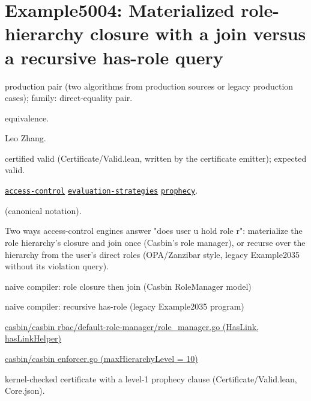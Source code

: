 \documentclass[10pt]{article}
\begin{document}
\Needspace{0.45\textheight}

\section{Example5004: Materialized role-hierarchy closure with a join versus a recursive has-role query}\label{case:Example5004}

\begin{description}[leftmargin=2.6cm,style=nextline,itemsep=1pt]

\item[Category] production pair (two algorithms from production sources or legacy production cases); family: direct-equality pair.

\item[Kind] equivalence.

\item[Contributors] Leo Zhang.

\item[Status] certified valid (Certificate/Valid.lean, written by the certificate emitter); expected valid.

\item[Tags] \hyperref[tag:access-control]{\texttt{access-control}} \hyperref[tag:evaluation-strategies]{\texttt{evaluation-strategies}} \hyperref[tag:prophecy]{\texttt{prophecy}}.

\item[Input]  (canonical notation).

\item[Summary] Two ways access-control engines answer "does user u hold role r": materialize the role hierarchy's closure and join once (Casbin's role manager), or recurse over the hierarchy from the user's direct roles (OPA/Zanzibar style, legacy Example2035 without its violation query).

\item[Sides] naive compiler: role closure then join (Casbin RoleManager model) \par naive compiler: recursive has-role (legacy Example2035 program)

\item[Sources] {\raggedright \href{https://github.com/casbin/casbin/blob/master/rbac/default-role-manager/role_manager.go}{casbin/casbin rbac/default-role-manager/role\_manager.go (HasLink, hasLinkHelper)} \par \href{https://github.com/casbin/casbin/blob/master/enforcer.go}{casbin/casbin enforcer.go (maxHierarchyLevel = 10)}\par}

\item[Prophecy] kernel-checked certificate with a level-1 prophecy clause (Certificate/Valid.lean, Core.json).

\end{description}
\end{document}
